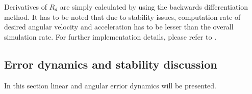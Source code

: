Derivatives of $R_d$ are simply calculated by using the backwards differentiation method. It has to be noted that due to stability issues, computation rate of desired angular velocity and acceleration has to be lesser than the overall simulation rate. For further implementation details, please refer to \cite{gitLink}.

\subsection{Error dynamics and stability discussion}

In this section linear and angular errior dynamics will be presented.



